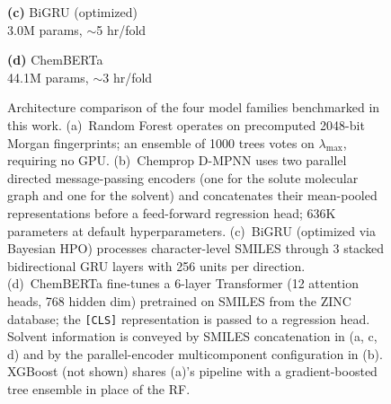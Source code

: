 \documentclass[journal=jcisd8,manuscript=article]{achemso}
\begin{document}
\begin{figure}[htbp]
\begin{minipage}[t]{0.23\textwidth}
\textbf{(c)} BiGRU (optimized)\\[2pt]
{\scriptsize 3.0M params, $\sim$5 hr/fold}
\end{minipage}
\hfill
\begin{minipage}[t]{0.23\textwidth}
\centering
{}

\textbf{(d)} ChemBERTa\\[2pt]
{\scriptsize 44.1M params, $\sim$3 hr/fold}
\end{minipage}

\caption{Architecture comparison of the four model families benchmarked in this work. (a)~Random Forest operates on precomputed 2048-bit Morgan fingerprints; an ensemble of 1000 trees votes on $\lambda_{\max}$, requiring no GPU. (b)~Chemprop D-MPNN uses two parallel directed message-passing encoders (one for the solute molecular graph and one for the solvent) and concatenates their mean-pooled representations before a feed-forward regression head; 636K parameters at default hyperparameters. (c)~BiGRU (optimized via Bayesian HPO) processes character-level SMILES through 3 stacked bidirectional GRU layers with 256 units per direction. (d)~ChemBERTa fine-tunes a 6-layer Transformer (12 attention heads, 768 hidden dim) pretrained on SMILES from the ZINC database; the \texttt{[CLS]} representation is passed to a regression head. Solvent information is conveyed by SMILES concatenation in (a, c, d) and by the parallel-encoder multicomponent configuration in (b). XGBoost (not shown) shares (a)'s pipeline with a gradient-boosted tree ensemble in place of the RF.}
\label{fig:model_overview}
\end{figure}
\end{document}
